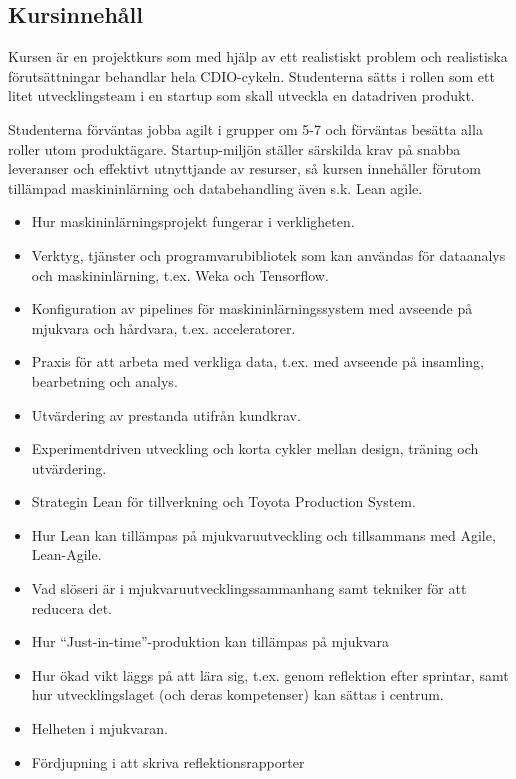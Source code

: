 \subsection*{Kursinnehåll}

Kursen är en projektkurs som med hjälp av ett realistiskt problem och
realistiska förutsättningar behandlar hela CDIO-cykeln. Studenterna
sätts i rollen som ett litet utvecklingsteam i en startup som skall
utveckla en datadriven produkt.

Studenterna förväntas jobba agilt i grupper om 5-7 och förväntas besätta
alla roller utom produktägare. Startup-miljön ställer särskilda krav på
snabba leveranser och effektivt utnyttjande av resurser, så kursen
innehåller förutom tillämpad maskininlärning och databehandling även
s.k. Lean agile.

\begin{itemize}
\tightlist
\item
  Hur maskininlärningsprojekt fungerar i verkligheten.
\item
  Verktyg, tjänster och programvarubibliotek som kan användas för
  dataanalys och maskininlärning, t.ex. Weka och Tensorflow.
\item
  Konfiguration av pipelines för maskininlärningssystem med avseende på
  mjukvara och hårdvara, t.ex. acceleratorer.
\item
  Praxis för att arbeta med verkliga data, t.ex. med avseende på
  insamling, bearbetning och analys.
\item
  Utvärdering av prestanda utifrån kundkrav.
\item
  Experimentdriven utveckling och korta cykler mellan design, träning
  och utvärdering.
\item
  Strategin Lean för tillverkning och Toyota Production System.
\item
  Hur Lean kan tillämpas på mjukvaruutveckling och tillsammans med
  Agile, Lean-Agile.
\item
  Vad slöseri är i mjukvaruutvecklingssammanhang samt tekniker för att
  reducera det.
\item
  Hur ``Just-in-time''-produktion kan tillämpas på mjukvara
\item
  Hur ökad vikt läggs på att lära sig, t.ex. genom reflektion efter
  sprintar, samt hur utvecklingslaget (och deras kompetenser) kan sättas
  i centrum.
\item
  Helheten i mjukvaran.
\item
  Fördjupning i att skriva reflektionsrapporter
\end{itemize}

